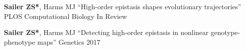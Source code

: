 

\begin{cvpublications}

  \cvpublication
    {\textbf{Sailer ZS*}, Harms MJ} %
    {``High-order epistasis shapes evolutionary trajectories''} %
    {PLOS Computational Biology} %
    {In Review} %

  \cvpublication
    {\textbf{Sailer ZS*}, Harms MJ} %
    {``Detecting high-order epistasis in nonlinear genotype-phenotype maps''} %
    {Genetics} %
    {2017} %

\end{cvpublications}
